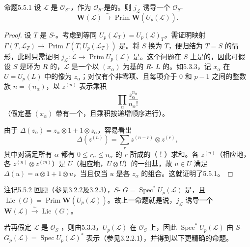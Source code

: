\begin{SGAresult}{命题}{5.5.1}
设 $\mathcal L$ 是 $\mathcal O_S$-，作为 $\mathcal O_S$-是的。则 $j_{\mathcal L}$ 诱导一个 $\mathcal O_S$-
\[
 \mathbf W(\mathcal L)\xrightarrow{\sim}\operatorname{Prim}\mathbf W(U_p(\mathcal L)).
\]
\end{SGAresult}
\begin{proof}
设 $T$ 是 $S$-。考虑到等同 $U_p(\mathcal L_T)=U_p(\mathcal L)_T$，需证明映射
$\Gamma(T,\mathcal L_T)\to\operatorname{Prim}\Gamma(T,U_p(\mathcal L_T))$ 是。将 $S$ 换为 $T$，便归结为 $T=S$ 的情形，此时只需证明 $j_{\mathcal L}:\mathcal L\to\operatorname{Prim}U_p(\mathcal L)$ 是。这个问题在 $S$ 上是的，因此可假设 $S$ 是环为 $R$ 的，$\mathcal L$ 是一个以 $(x_\alpha)$ 为基的 $R$- $L$ 的。如5.3.3，记 $x_\alpha$ 在 $U=U_p(L)$ 中的像为 $z_\alpha$；对仅有个非零项、且每项介于 $0$ 和 $p-1$ 之间的整数族 $n=(n_\alpha)$，以 $z^{(n)}$ 表示乘积
\[
 \prod_\alpha\frac{z_\alpha^{n_\alpha}}{n_\alpha!}
\]
（假定基 $(x_\alpha)$ 带有一个，且乘积按递增顺序进行）。

由于 $\Delta(z_\alpha)=z_\alpha\otimes1+1\otimes z_\alpha$，容易看出
\[
 \Delta(z^{(n)})=\sum_r z^{(n-r)}\otimes z^{(r)},
\]
其中对满足所有 $\alpha$ 都有 $0\le r_\alpha\le n_\alpha$ 的 $r$ 所成的（！）求和。各 $z^{(n)}$（相应地，各 $z^{(n)}\otimes z^{(m)}$）是 $U$（相应地，$U\otimes U$）的一组基，故 $u\in U$ 满足 $\Delta(u)=u\otimes1+1\otimes u$，当且仅当 $u$ 是各 $z_\alpha$ 的组合。这就证明了5.5.1。
\end{proof}

\begin{SGAresult}{注记}{5.5.2}
回顾（参见3.2.2及3.2.3），$S$- $G=\operatorname{Spec}^*U_p(\mathcal L)$ 是，且
$\operatorname{Lie}(G)=\operatorname{Prim}\mathbf W(U_p(\mathcal L))$。故上一命题就是说，$j_{\mathcal L}$ 诱导一个 $\mathbf W(\mathcal L)\xrightarrow{\sim}\operatorname{Lie}(G)$。

若再假定 $\mathcal L$ 是 $\mathcal O_S$-，则由5.3.3，$U_p(\mathcal L)$ 在 $\mathcal O_S$ 上，因此 $\operatorname{Spec}^*U_p(\mathcal L)$ 由 $S$- $G_p(\mathcal L)=\operatorname{Spec}U_p(\mathcal L)^*$ 表示（参见3.2.2.1），并得到以下更精确的命题。
\end{SGAresult}

